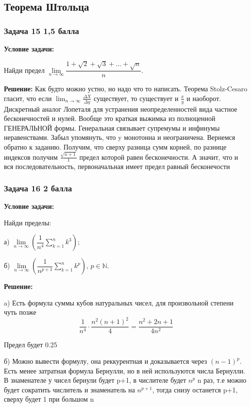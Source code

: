 \documentclass[a4paper,12pt]{article}
\begin{document}
\subsection{Теорема Штольца}

\subsubsection{Задача 15 \hfill 1,5 балла}

\textbf{Условие задачи:}

Найди предел \( \lim\limits_{n \to \infty} \dfrac{1 + \sqrt{2} + \sqrt{3} + \dots + \sqrt{n}}{n} \).


\textbf{Решение: }
Как будто можно устно, но надо что то написать. Теорема Stolz-Cesaro гласит, что если $\lim_{n \to \infty} \frac{\Delta X}{\Delta y}$ существует, то существует и $\frac{x}{y}$ и наоборот. Дискретный аналог Лопеталя для устранения неопределенностей вида частное бесконечностей и нулей. Вообще это краткая выжимка из полноценной ГЕНЕРАЛЬНОЙ формы. Генеральная связывает супремумы и инфинумы неравенствами. Забыл упомянуть, что y монотонна и неограничена. Вернемся обратно к заданию. Получим, что сверху разница сумм корней, по разнице индексов получим $\frac{\sqrt{n+1}}{1}$ предел которой равен бесконечности. А значит, что и вся последовательность, первоначальная имеет предел равный бесконечости
\vspace{1cm}

\subsubsection{Задача 16 \hfill 2 балла}

\textbf{Условие задачи:}

Найди пределы:

а) \( \lim\limits_{n \to \infty} \left( \dfrac{1}{n^4} \sum\limits_{k=1}^{n} k^3 \right) \);

б) \( \lim\limits_{n \to \infty} \left( \dfrac{1}{n^{p+1}} \sum\limits_{k=1}^{n} k^p \right) \), \( p \in \mathbb{N} \).

\textbf{Решение: }

a) Есть формула суммы кубов натуральных чисел, для произвольной степени чуть позже
\[
\frac{1}{n^4} \cdot \frac{n^2(n+1)^2}{4} = \frac{n^2+2n+1}{4n^2}
\]

Предел будет 0.25

б) Можно вывести формулу, она реккурентная и доказывается через $(n-1)^p$. Есть менее затратная формула Бернулли, но в ней используются числа Бернулли. В знаменателе у чисел бернули будет p+1, в числителе будет $n^p$ n раз, т.е можно будет сократить числитель и знаменатель на $n^{p+1}$, тогда снизу останется p+1, сверху будет 1 при большом n
\end{document}
